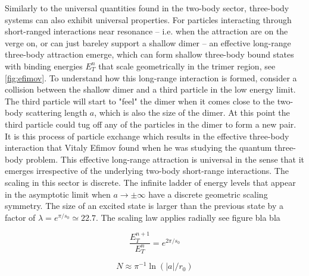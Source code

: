 \documentclass{article}
\providecommand{\abs}[1]{\lvert#1\rvert} \providecommand{\norm}[1]{\lVert#1\rVert}
\numberwithin{equation}{section}
\numberwithin{figure}{section}
\begin{document}
Similarly to the universal quantities found in the two-body sector, three-body systems can also exhibit universal properties. For particles interacting through short-ranged interactions near resonance -- i.e. when the attraction are on the verge on, or can just bareley support a shallow dimer -- an effective long-range three-body attraction emerge, which can form shallow three-body bound states with binding energies $E_T^n$ that scale geometrically in the trimer region, see \cref{fig:efimov}. To understand how this long-range interaction is formed, consider a collision between the shallow dimer and a third particle in the low energy limit. The third particle will start to "feel" the dimer when it comes close to the two-body scattering length $a$, which is also the size of the dimer. At this point the third particle could tug off any of the particles in the dimer to form a new pair. It is this process of particle exchange which results in the effective three-body interaction that Vitaly Efimov found when he was studying the quantum three-body problem. This effective long-range attraction is universal in the sense that it emerges irrespective of the underlying two-body short-range interactions. The scaling in this sector is discrete. The infinite ladder of energy levels that appear in the asymptotic limit when $a \to \pm \infty$ have a discrete geometric scaling symmetry. The size of an excited state is larger than the previous state by a factor of $\lambda = e^{\pi/s_0} \simeq 22.7$. The scaling law applies radially see figure bla bla %

\begin{equation}
\frac{E_T^{n+1}}{E_T^{n}} = e^{2\pi/s_0}
\end{equation}

\begin{equation}
N \approx \pi^{-1} \ln(\abs{a}/r_0)
\end{equation}
\end{document}
